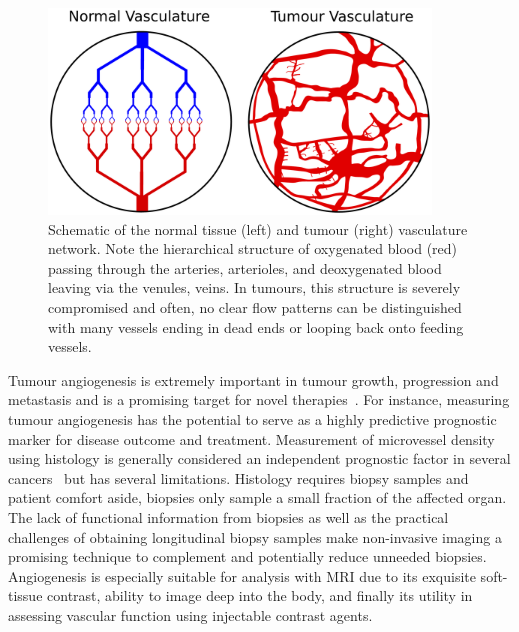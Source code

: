 \begin{figure}  
 \begin{center}  
 \includegraphics[width=4in]{intro/intro-images/tumourVasculature.pdf}
 \caption{Schematic of the normal tissue (left) and tumour (right) vasculature network. 
 Note the hierarchical structure of oxygenated blood (red) passing through the arteries, arterioles, and deoxygenated blood leaving via the venules, veins. 
 In tumours, this structure is severely compromised and often, no clear flow patterns can be distinguished with many vessels ending in dead ends or looping back onto feeding vessels.}
 \label{tumourVasculature}
 \end{center}
\end{figure}

Tumour angiogenesis is extremely important in tumour growth, progression and metastasis and is a promising target for novel therapies~\cite{Miles:2000wq}.
For instance, measuring tumour angiogenesis has the potential to serve as a highly predictive prognostic marker for disease outcome and treatment.
Measurement of microvessel density using histology is generally considered an independent prognostic factor in several cancers~\cite{Kather:2015ej} but has several limitations.
Histology requires biopsy samples and patient comfort aside, biopsies only sample a small fraction of the affected organ.
The lack of functional information from biopsies as well as the practical challenges of obtaining longitudinal biopsy samples make non-invasive imaging a promising technique to complement and potentially reduce unneeded biopsies.
Angiogenesis is especially suitable for analysis with MRI due to its exquisite soft-tissue contrast, ability to image deep into the body, and finally its utility in assessing vascular function using injectable contrast agents.

